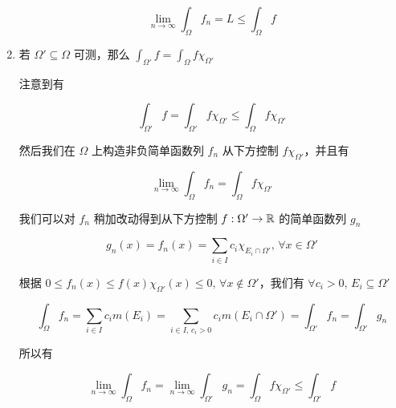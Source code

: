 \begin{enumerate}
    \[
    \lim_{n \to \infty}\int_{\Omega} f_n = L \le \int_{\Omega} f
    \]

    \item 若 $\Omega' \subseteq \Omega$ 可测，那么 $\int_{\Omega'}f = \int_{\Omega} f\chi_{\Omega'}$

    注意到有

    \[
        \int_{\Omega'}f = \int_{\Omega'}f\chi_{\Omega'} \le \int_{\Omega}f\chi_{\Omega'}
    \]

    然后我们在 $\Omega$ 上构造非负简单函数列 $f_n$ 从下方控制  $f \chi_{\Omega'}$，并且有

    \[
        \lim_{n \to \infty}\int_{\Omega} f_n = \int_{\Omega}f \chi_{\Omega'}
    \]

    我们可以对 $f_n$ 稍加改动得到从下方控制 $f: \Omega' \to \mathbb{R}$ 的简单函数列 $g_n$

    \[
        g_n(x) = f_n(x) = \sum_{i \in I} c_i \chi_{E_i \cap \Omega'},\, \forall x \in \Omega'
    \]

    根据 $0 \le f_n(x) \le f(x)\chi_{\Omega'}(x) \le 0,\, \forall x \notin \Omega'$，我们有 $\forall c_i >0,\, E_i \subseteq \Omega'$

    \[
        \int_{\Omega} f_n = \sum_{i \in I} c_i m(E_i) = \sum_{i \in I,\, c_i > 0} c_i m(E_i \cap \Omega') = \int_{\Omega'}f_n = \int_{\Omega'}g_n
    \]

    所以有

    \[
        \lim_{n \to \infty}\int_{\Omega} f_n = \lim_{n \to \infty}\int_{\Omega'}g_n = \int_{\Omega}f \chi_{\Omega'} \le \int_{\Omega'}f 
    \]

\end{enumerate}